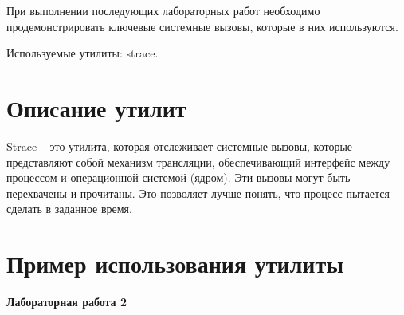 \documentclass[pdf, unicode, 12pt, a4paper,oneside,fleqn]{article}
\begin{document}
При выполнении последующих лабораторных работ необходимо продемонстрировать 
ключевые системные вызовы, которые в них используются.

Используемые утилиты: strace.

\section{Описание утилит}

Strace \---  это утилита, которая отслеживает системные вызовы, которые представляют собой механизм трансляции, 
обеспечивающий интерфейс между процессом и операционной системой (ядром). 
Эти вызовы могут быть перехвачены и прочитаны. Это позволяет лучше понять, что процесс пытается сделать в заданное время.


\section{Пример использования утилиты}

{\large\textbf{Лабораторная работа 2}}
\end{document}
